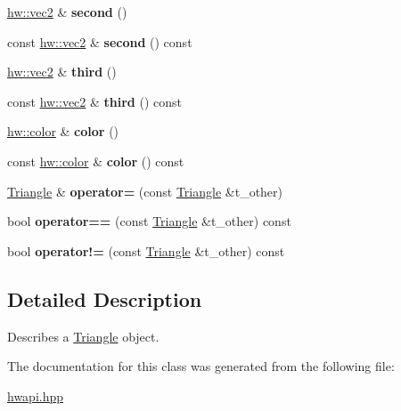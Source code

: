 \begin{DoxyCompactItemize}
\item 
\mbox{\label{classdummy__api_1_1Triangle_afbf31835af7cbdb17f460ecc951960b7}} 
\mbox{\hyperlink{structhw_1_1vec2}{hw\+::vec2}} \& {\bfseries second} ()
\item 
\mbox{\label{classdummy__api_1_1Triangle_acf7eb6f778ef2d5138335c0fdd7a22be}} 
const \mbox{\hyperlink{structhw_1_1vec2}{hw\+::vec2}} \& {\bfseries second} () const
\item 
\mbox{\label{classdummy__api_1_1Triangle_afd7391cff8a657305e9b2c04877cba5c}} 
\mbox{\hyperlink{structhw_1_1vec2}{hw\+::vec2}} \& {\bfseries third} ()
\item 
\mbox{\label{classdummy__api_1_1Triangle_a9227f1168e09b455d5c0753de9b023b6}} 
const \mbox{\hyperlink{structhw_1_1vec2}{hw\+::vec2}} \& {\bfseries third} () const
\item 
\mbox{\label{classdummy__api_1_1Triangle_a566974d19f2eb54ac22ac7c528c0d484}} 
\mbox{\hyperlink{structhw_1_1color}{hw\+::color}} \& {\bfseries color} ()
\item 
\mbox{\label{classdummy__api_1_1Triangle_ae8ce528ced2eeed99c17e1bc90ae5d57}} 
const \mbox{\hyperlink{structhw_1_1color}{hw\+::color}} \& {\bfseries color} () const
\item 
\mbox{\label{classdummy__api_1_1Triangle_a0a1f98fc166be46ca2802cff0b9c39f6}} 
\mbox{\hyperlink{classdummy__api_1_1Triangle}{Triangle}} \& {\bfseries operator=} (const \mbox{\hyperlink{classdummy__api_1_1Triangle}{Triangle}} \&t\+\_\+other)
\item 
\mbox{\label{classdummy__api_1_1Triangle_afc023a737f204cc023833c515d0a0779}} 
bool {\bfseries operator==} (const \mbox{\hyperlink{classdummy__api_1_1Triangle}{Triangle}} \&t\+\_\+other) const
\item 
\mbox{\label{classdummy__api_1_1Triangle_a4cab7038f3df21595a587347ab92a234}} 
bool {\bfseries operator!=} (const \mbox{\hyperlink{classdummy__api_1_1Triangle}{Triangle}} \&t\+\_\+other) const
\end{DoxyCompactItemize}


\subsection{Detailed Description}
Describes a \mbox{\hyperlink{classdummy__api_1_1Triangle}{Triangle}} object. 

The documentation for this class was generated from the following file\+:\begin{DoxyCompactItemize}
\item 
\mbox{\hyperlink{hwapi_8hpp}{hwapi.\+hpp}}\end{DoxyCompactItemize}
